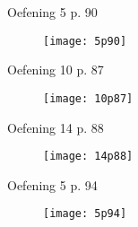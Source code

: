 \begin{frame}{Oefening 5 p. 90}
\begin{figure}
\texttt{[image: 5p90]}
\end{figure}
\end{frame}

\begin{frame}{Oefening 10 p. 87}
\begin{figure}
\texttt{[image: 10p87]}
\end{figure}
\end{frame}

\begin{frame}{Oefening 14 p. 88}
\begin{figure}
\texttt{[image: 14p88]}
\end{figure}
\end{frame}

\begin{frame}{Oefening 5 p. 94}
\begin{figure}
\texttt{[image: 5p94]}
\end{figure}
\end{frame}

